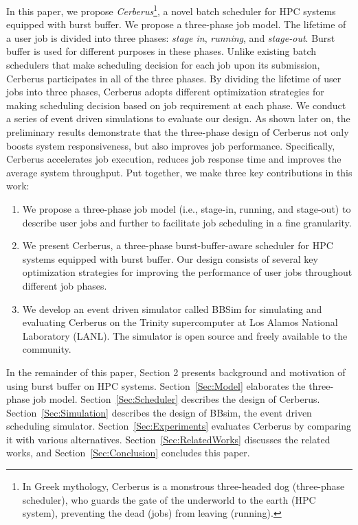 In this paper, we propose \textit{Cerberus}\footnote{In Greek mythology,
Cerberus is a monstrous three-headed dog (three-phase scheduler),
who guards the gate of the underworld to the earth (HPC system),
preventing the dead (jobs) from leaving (running).},
a novel batch scheduler for HPC systems equipped with burst buffer. 
We propose a three-phase job model.
The lifetime of a user job is divided into three phases:
\textit{stage in}, \textit{running}, and \textit{stage-out}.
Burst buffer is used for different purposes in these phases.
Unlike existing batch schedulers that make scheduling decision for each job upon its submission,
Cerberus participates in all of the three phases.
By dividing the lifetime of user jobs into three phases,
Cerberus adopts different optimization strategies for 
making scheduling decision based on job requirement at each phase.
We conduct a series of event driven simulations to evaluate our design. 
As shown later on,
the preliminary results demonstrate that the three-phase design of Cerberus 
not only boosts system responsiveness, but also improves job performance. 
Specifically,
Cerberus accelerates job execution, reduces job response time 
and improves the average system throughput.
Put together, we make three key contributions in this work:
\begin{enumerate}
        \item    We propose a three-phase job model (i.e., stage-in, running, and stage-out) 
        to describe user jobs and further to facilitate job scheduling in a fine granularity.
        
        \item    We present Cerberus, 
        a three-phase burst-buffer-aware scheduler for HPC systems equipped with burst buffer. 
        Our design consists of several key optimization strategies for 
        improving the performance of user jobs throughout different job phases.
        
        \item    We develop an event driven simulator called BBSim 
        for simulating and evaluating Cerberus on the Trinity 
        supercomputer at Los Alamos National Laboratory (LANL)\cite{TrinitySystem}. 
        The simulator is open source and freely available to the community\cite{bbsim-github}.
\end{enumerate}


In the remainder of this paper, Section 2 presents background and 
motivation of using burst buffer on HPC systems.
Section~\ref{Sec:Model} elaborates the three-phase job model.
Section~\ref{Sec:Scheduler} describes the design of Cerberus.
Section~\ref{Sec:Simulation} describes the design of BBsim, the event driven scheduling simulator.
Section~\ref{Sec:Experiments} evaluates Cerberus by comparing it with various alternatives.
Section~\ref{Sec:RelatedWorks} discusses the related works, 
and Section~\ref{Sec:Conclusion} concludes this paper.


